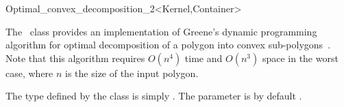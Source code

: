 
\ccRefPageBegin

\begin{ccRefClass}{Optimal_convex_decomposition_2<Kernel,Container>}
\label{mink_ref:opt_decomp}

\ccDefinition

The \ccRefName\ class provides an implementation of Greene's
dynamic programming algorithm for optimal decomposition of a
polygon into convex sub-polygons~\cite{g-dpcp-83}. Note that
this algorithm requires $O(n^4)$ time and $O(n^3)$ space in
the worst case, where $n$ is the size of the input polygon.

The  type defined by the class is simply
. The  parameter
is by default .


\ccIsModel

\ccSeeAlso
{}

\end{ccRefClass}

\ccRefPageEnd
